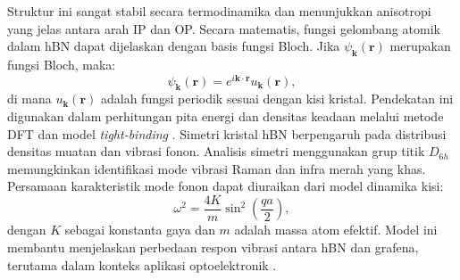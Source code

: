 Struktur ini sangat stabil secara termodinamika dan menunjukkan anisotropi yang jelas antara arah IP dan OP. Secara matematis, fungsi gelombang atomik dalam hBN dapat dijelaskan dengan basis fungsi Bloch. Jika \(\psi_{\mathbf{k}}(\mathbf{r})\) merupakan fungsi Bloch, maka:
\begin{equation}
    \psi_{\mathbf{k}}(\mathbf{r}) = e^{i\mathbf{k}\cdot\mathbf{r}} u_{\mathbf{k}}(\mathbf{r}),
\end{equation}
di mana \(u_{\mathbf{k}}(\mathbf{r})\) adalah fungsi periodik sesuai dengan kisi kristal. Pendekatan ini digunakan dalam perhitungan pita energi dan densitas keadaan melalui metode DFT dan model \emph{tight-binding} \cite{CastroNeto2009}.
Simetri kristal hBN berpengaruh pada distribusi densitas muatan dan vibrasi fonon. Analisis simetri menggunakan grup titik \(D_{6h}\) memungkinkan identifikasi mode vibrasi Raman dan infra merah yang khas. Persamaan karakteristik mode fonon dapat diuraikan dari model dinamika kisi:
\begin{equation}
    \omega^2 = \frac{4K}{m}\sin^2\left(\frac{qa}{2}\right),
\end{equation}
dengan \(K\) sebagai konstanta gaya dan \(m\) adalah massa atom efektif. Model ini membantu menjelaskan perbedaan respon vibrasi antara hBN dan grafena, terutama dalam konteks aplikasi optoelektronik \cite{Wang2017}.

